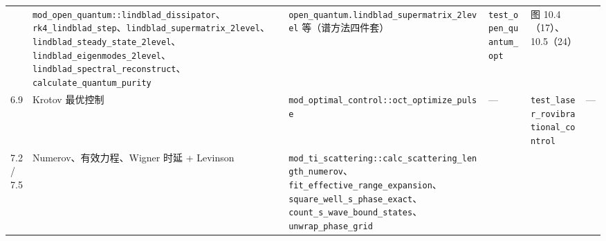 \documentclass[
]{ctexbook}
\begin{document}
\begin{longtable}[]{@{}llllll@{}}
\begin{minipage}[t]{0.14\columnwidth}
\end{minipage} & \begin{minipage}[t]{0.14\columnwidth}\raggedright
\texttt{mod\_open\_quantum::lindblad\_dissipator}、\texttt{rk4\_lindblad\_step}、\texttt{lindblad\_supermatrix\_2level}、\texttt{lindblad\_steady\_state\_2level}、\texttt{lindblad\_eigenmodes\_2level}、\texttt{lindblad\_spectral\_reconstruct}、\texttt{calculate\_quantum\_purity}\strut
\end{minipage} & \begin{minipage}[t]{0.14\columnwidth}\raggedright
\texttt{open\_quantum.lindblad\_supermatrix\_2level}
等（谱方法四件套）\strut
\end{minipage} & \begin{minipage}[t]{0.14\columnwidth}\raggedright
\texttt{test\_open\_quantum\_opt}\strut
\end{minipage} & \begin{minipage}[t]{0.14\columnwidth}\raggedright
图 10.4（17）、10.5（24）\strut
\end{minipage}\tabularnewline
\begin{minipage}[t]{0.14\columnwidth}\raggedright
6.9\strut
\end{minipage} & \begin{minipage}[t]{0.14\columnwidth}\raggedright
Krotov 最优控制\strut
\end{minipage} & \begin{minipage}[t]{0.14\columnwidth}\raggedright
\texttt{mod\_optimal\_control::oct\_optimize\_pulse}\strut
\end{minipage} & \begin{minipage}[t]{0.14\columnwidth}\raggedright
---\strut
\end{minipage} & \begin{minipage}[t]{0.14\columnwidth}\raggedright
\texttt{test\_laser\_rovibrational\_control}\strut
\end{minipage} & \begin{minipage}[t]{0.14\columnwidth}\raggedright
---\strut
\end{minipage}\tabularnewline
\begin{minipage}[t]{0.14\columnwidth}\raggedright
7.2 / 7.5\strut
\end{minipage} & \begin{minipage}[t]{0.14\columnwidth}\raggedright
Numerov、有效力程、Wigner 时延 + Levinson\strut
\end{minipage} & \begin{minipage}[t]{0.14\columnwidth}\raggedright
\texttt{mod\_ti\_scattering::calc\_scattering\_length\_numerov}、\texttt{fit\_effective\_range\_expansion}、\texttt{square\_well\_s\_phase\_exact}、\texttt{count\_s\_wave\_bound\_states}、\texttt{unwrap\_phase\_grid}\strut

\end{minipage}
\end{longtable}
\end{document}
